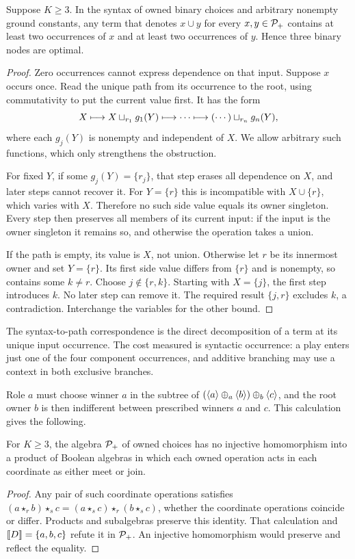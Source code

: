 \begin{proposition}\label{game:thm:lower}
Suppose $K\geq3$. In the syntax of owned binary choices and arbitrary
nonempty ground constants, any term that denotes $x\cup y$ for every
$x,y\in\mathcal P_+$ contains at least two occurrences of $x$ and at least two
occurrences of $y$. Hence three binary nodes are optimal.
\end{proposition}
\begin{proof}
Zero occurrences cannot express dependence on that input. Suppose $x$
occurs once. Read the unique path from its occurrence to the root, using
commutativity to put the current value first. It has the form
\[
 X\longmapsto X\mathbin{\sqcup_{r_1}}g_1(Y)
   \longmapsto\cdots\longmapsto (\cdots)\mathbin{\sqcup_{r_n}}g_n(Y),
\]
where each $g_j(Y)$ is nonempty and independent of $X$. We allow arbitrary
such functions, which only strengthens the obstruction.

For fixed $Y$, if some $g_j(Y)=\{r_j\}$, that step erases all dependence
on $X$, and later steps cannot recover it. For $Y=\{r\}$ this is
incompatible with $X\cup\{r\}$, which varies with $X$. Therefore no such
side value equals its owner singleton. Every step then preserves all
members of its current input: if the input is the owner singleton it
remains so, and otherwise the operation takes a union.

If the path is empty, its value is $X$, not union. Otherwise let $r$ be
its innermost owner and set $Y=\{r\}$. Its first side value differs from
$\{r\}$ and is nonempty, so contains some $k\ne r$. Choose
$j\notin\{r,k\}$. Starting with $X=\{j\}$, the first step introduces
$k$. No later step can remove it. The required result $\{j,r\}$ excludes
$k$, a contradiction. Interchange the variables for the other bound.
\end{proof}

The syntax-to-path correspondence is the direct decomposition of a term at its unique input occurrence. The cost measured is syntactic occurrence: a play enters just one of the four
component occurrences, and additive branching may use a context in both exclusive branches.

Role $a$ must choose winner $a$ in the subtree of $(\langle a\rangle\mathbin{\oplus_{a}}\langle b\rangle)\mathbin{\oplus_{b}}\langle c\rangle$, and the root owner $b$ is then indifferent between prescribed winners $a$ and $c$. This calculation gives the following.

\begin{proposition}
\label{cor:no-boolean-product}
For $K\ge3$, the algebra $\mathcal P_+$ of owned choices has no injective homomorphism into a
product of Boolean algebras in which each owned operation acts in each
coordinate as either meet or join.
\end{proposition}
\begin{proof}
Any pair of such coordinate operations satisfies
$(a\star_r b)\star_s c
 =(a\star_s c)\star_r(b\star_s c)$, whether the coordinate operations
coincide or differ. Products and subalgebras preserve this identity.
That calculation and $\llbracket D\rrbracket=\{a,b,c\}$ refute it in $\mathcal P_+$.
An injective homomorphism would preserve and reflect the equality.
\end{proof}

